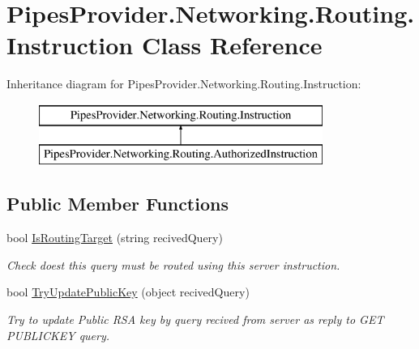\hypertarget{class_pipes_provider_1_1_networking_1_1_routing_1_1_instruction}{}\section{Pipes\+Provider.\+Networking.\+Routing.\+Instruction Class Reference}
\label{class_pipes_provider_1_1_networking_1_1_routing_1_1_instruction}


 


Inheritance diagram for Pipes\+Provider.\+Networking.\+Routing.\+Instruction\+:\begin{figure}[H]
\begin{center}
\leavevmode
\includegraphics[height=2.000000cm]{d5/d2e/class_pipes_provider_1_1_networking_1_1_routing_1_1_instruction}
\end{center}
\end{figure}
\subsection*{Public Member Functions}
\begin{DoxyCompactItemize}
\item 
bool \mbox{\hyperlink{class_pipes_provider_1_1_networking_1_1_routing_1_1_instruction_a376135eac06c59b1df8d2f5d1617bed9}{Is\+Routing\+Target}} (string recived\+Query)
\begin{DoxyCompactList}\small\item\em Check doest this query must be routed using this server instruction. \end{DoxyCompactList}\item 
bool \mbox{\hyperlink{class_pipes_provider_1_1_networking_1_1_routing_1_1_instruction_a04ee08d3b41785e88679c6870c392266}{Try\+Update\+Public\+Key}} (object recived\+Query)
\begin{DoxyCompactList}\small\item\em Try to update Public R\+SA key by query recived from server as reply to G\+ET P\+U\+B\+L\+I\+C\+K\+EY query. \end{DoxyCompactList}\end{DoxyCompactItemize}
